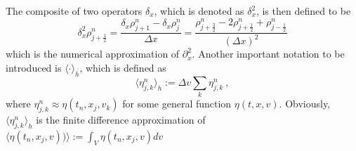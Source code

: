 \documentclass[11pt,twoside]{article}
\theoremstyle{nonumberplain}
\begin{document}
The composite of two operators $\delta_x$, which is denoted as $\delta_x^2$, is then defined to be 
$$
\delta_x^2\rho_{j+\frac{1}{2}}^n=\frac{\delta_ x\rho_{j+1}^n-\delta_x\rho_{j}^n}{\Delta x}=\frac{\rho_{j+\frac{3}{2}}^n-2\rho_{j+\frac{1}{2}}^n+\rho_{j-\frac{1}{2}}^n}{(\Delta x)^2}
$$
which is the numerical approximation of $\partial_x^2$. Another important notation to be introduced is $\langle \cdot \rangle_h$, which is defined as
$$
\langle \eta_{j,k}^n \rangle_h:=\Delta v\sum_k\eta_{j,k}^n\ ,
$$
where $\eta_{j,k}^n\approx \eta(t_n,x_j,v_k)$ for some general function $\eta(t,x,v)$. Obviously, $\langle \eta_{j,k}^n \rangle_h$ is the finite difference approximation of $\langle \eta(t_n,x_j,v))\rangle:=\int_V \eta(t_n,x_j,v) dv$

 
\end{document}
